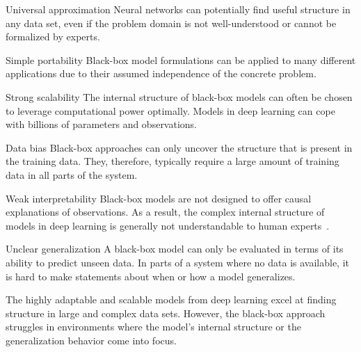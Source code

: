 \begin{Pros}
    \begin{compactdesc}
        \item[Universal approximation]
        Neural networks can potentially find useful structure in any data set, even if the problem domain is not well-understood or cannot be formalized by experts.
        \item[Simple portability]
        Black-box model formulations can be applied to many different applications due to their assumed independence of the concrete problem.
        \item[Strong scalability]
        The internal structure of black-box models can often be chosen to leverage computational power optimally.
        Models in deep learning can cope with billions of parameters and observations.
    \end{compactdesc}
\end{Pros}
\begin{Cons}
    \begin{compactdesc}
        \item[Data bias]
        Black-box approaches can only uncover the structure that is present in the training data.
        They, therefore, typically require a large amount of training data in all parts of the system.
        \item[Weak interpretability]
        Black-box models are not designed to offer causal explanations of observations.
        As a result, the complex internal structure of models in deep learning is generally not understandable to human experts~\parencite{rudin_stop_2019}.
        \item[Unclear generalization]
        A black-box model can only be evaluated in terms of its ability to predict unseen data.
        In parts of a system where no data is available, it is hard to make statements about when or how a model generalizes.
    \end{compactdesc}
\end{Cons}

The highly adaptable and scalable models from deep learning excel at finding structure in large and complex data sets.
However, the black-box approach struggles in environments where the model's internal structure or the generalization behavior come into focus.



